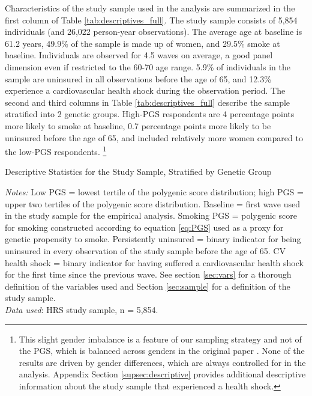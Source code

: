 \documentclass[11pt]{article}
\begin{document}
Characteristics of the study sample used in the analysis are summarized in the first column of Table \ref{tab:descriptives_full}.
The study sample consists of 5,854 individuals (and 26,022 person-year observations).
The average age at baseline is 61.2 years, 49.9\% of the sample is made up of women, and 29.5\% smoke at baseline.
Individuals are observed for 4.5 waves on average, a good panel dimension even if restricted to the 60-70 age range.
5.9\% of individuals in the sample are uninsured in all observations before the age of 65, and 12.3\% experience a cardiovascular health shock during the observation period.
The second and third columns in Table \ref{tab:descriptives_full} describe the sample stratified into 2 genetic groups.
High-PGS respondents are 4 percentage points more likely to smoke at baseline, 0.7 percentage points more likely to be uninsured before the age of 65, and included relatively more women compared to the low-PGS respondents.%
\footnote{This slight gender imbalance is a feature of our sampling strategy and not of the PGS, which is balanced across genders in the original paper \citep{GSCAN2019gwas}. None of the results are driven by gender differences, which are always controlled for in the analysis.
Appendix Section \ref{supsec:descriptive} provides additional descriptive information about the study sample that experienced a health shock.}

\begin{table}[!ht]
	\caption{Descriptive Statistics for the Study Sample, Stratified by Genetic Group \vspace{-0.3cm}}
	\label{tab:descriptives_full}
		

	{\footnotesize \raggedright \vspace{1ex}
	\textit{Notes:}
	Low PGS = lowest tertile of the polygenic score distribution; high PGS = upper two tertiles of the polygenic score distribution.
	Baseline = first wave used in the study sample for the empirical analysis.
	Smoking PGS = polygenic score for smoking constructed according to equation \ref{eq:PGS} used as a proxy for genetic propensity to smoke.
	Persistently uninsured = binary indicator for being uninsured in every observation of the study sample before the age of 65.
	CV health shock = binary indicator for having suffered a cardiovascular health shock for the first time since the previous wave.
	See section \ref{sec:vars} for a thorough definition of the variables used and Section \ref{sec:sample} for a definition of the study sample. \\
	\textit{Data used}: HRS study sample, n = 5,854.
	\par}
\end{table}
\end{document}
